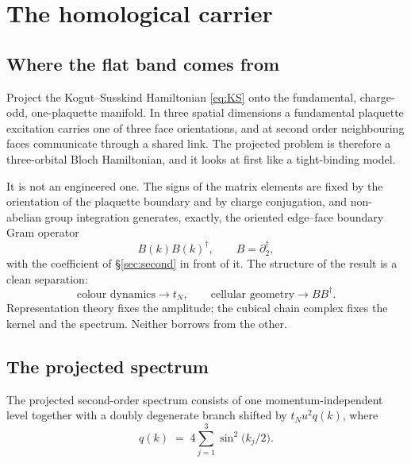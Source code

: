\section{The homological carrier}
\label{sec:carrier}

\subsection{Where the flat band comes from}

Project the Kogut--Susskind Hamiltonian \eqref{eq:KS} onto the
fundamental, charge-odd, one-plaquette manifold. In three spatial
dimensions a fundamental plaquette excitation carries one of three face
orientations, and at second order neighbouring faces communicate
through a shared link. The projected problem is therefore a
three-orbital Bloch Hamiltonian, and it looks at first like a
tight-binding model.

It is not an engineered one. The signs of the matrix elements are fixed
by the orientation of the plaquette boundary and by charge conjugation,
and non-abelian group integration generates, exactly, the oriented
edge--face boundary Gram operator
\begin{equation}
  B(k)B(k)^{\dagger},
  \qquad B = \partial_2^{\dagger},
\end{equation}
with the coefficient of \S\ref{sec:second} in front of it. The
structure of the result is a clean separation:
\begin{equation}
  \boxed{\ \text{colour dynamics} \longrightarrow t_N,
  \qquad
  \text{cellular geometry} \longrightarrow BB^{\dagger}. \ }
  \label{eq:separation}
\end{equation}
Representation theory fixes the amplitude; the cubical chain complex
fixes the kernel and the spectrum. Neither borrows from the other.

\subsection{The projected spectrum}

\begin{theorem}
\label{thm:projspec}
The projected second-order spectrum consists of one
momentum-independent level together with a doubly degenerate branch
shifted by $t_N u^2 q(k)$, where
\begin{equation}
  q(k) \;=\; 4\sum_{j=1}^{3} \sin^2\!\big(k_j/2\big).
\end{equation}
\end{theorem}

